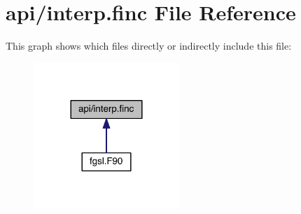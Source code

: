 \hypertarget{interp_8finc}{\section{api/interp.finc File Reference}
\label{interp_8finc}
}
This graph shows which files directly or indirectly include this file\-:
\nopagebreak
\begin{figure}[H]
\begin{center}
\leavevmode
\includegraphics[width=156pt]{interp_8finc__dep__incl}
\end{center}
\end{figure}
